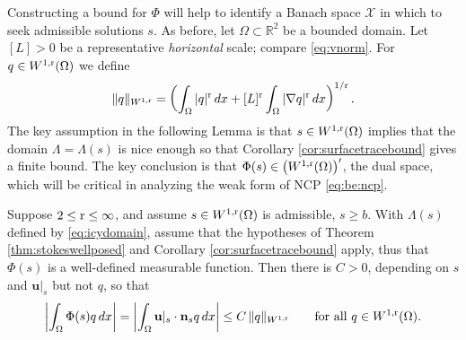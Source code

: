 \documentclass[hidelinks,onefignum,onetabnum,final]{siamart220329}  %
\newcommand{\RR}{\mathbb{R}}
\newcommand{\grad}{\nabla}
\newcommand{\bn}{\mathbf{n}}
\newcommand{\bu}{\mathbf{u}}
\newcommand{\cX}{\mathcal{X}}
\newcommand{\rr}{{\text{\textnormal{r}}}}
\begin{document}
Constructing a bound for $\Phi$ will help to identify a Banach space $\cX$ in which to seek admissible solutions $s$.  As before, let $\Omega \subset \RR^2$ be a bounded domain.  Let $[L]>0$ be a representative \emph{horizontal} scale; compare \eqref{eq:vnorm}.  For $q\in W^{1,\rr}(\Omega)$ we define
\begin{equation}
\|q\|_{W^{1,\rr}} = \left(\int_\Omega |q|^\rr\,dx + [L]^\rr \int_\Omega |\grad q|^\rr\,dx\right)^{1/\rr}. \label{eq:norm:Omega}
\end{equation}
The key assumption in the following Lemma is that $s\in W^{1,\rr}(\Omega)$ implies that the domain $\Lambda=\Lambda(s)$ is nice enough so that Corollary \ref{cor:surfacetracebound} gives a finite bound.  The key conclusion is that $\Phi(s) \in \left(W^{1,\rr}(\Omega)\right)'$, the dual space, which will be critical in analyzing the weak form of NCP \eqref{eq:be:ncp}.

\begin{lemma} \label{lem:phibound:early}  Suppose $2 \le \rr \le \infty$, and assume $s\in W^{1,\rr}(\Omega)$ is admissible, $s\ge b$.  With $\Lambda(s)$ defined by \eqref{eq:icydomain}, assume that the hypotheses of Theorem \ref{thm:stokeswellposed} and Corollary \ref{cor:surfacetracebound} apply, thus that $\Phi(s)$ is a well-defined measurable function.  Then there is $C>0$, depending on $s$ and $\bu|_s$ but not $q$, so that
\begin{equation}
\left|\int_\Omega \Phi(s) q\,dx\right| = \left|\int_\Omega \bu|_s\cdot \bn_s q\,dx\right| \le C\, \|q\|_{W^{1,\rr}} \qquad \text{for all } q\in W^{1,\rr}(\Omega).  \label{eq:phibound:early}
\end{equation}
\end{lemma}
\end{document}
